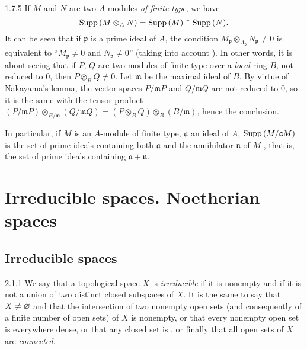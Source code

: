 \begin{env}{1.7.5}
\label{env-0.1.7.5}
If $M$ and $N$ are two $A$-modules \emph{of finite type}, we have
\[
  {\mathop{\mathrm{Supp}}\nolimits}\,(M\otimes_A N)={\mathop{\mathrm{Supp}}\nolimits}\,(M)\cap{\mathop{\mathrm{Supp}}\nolimits}\,(N).
\]
It can be seen that if $\mathfrak{p}$ is a prime ideal of $A$, the condition
$M_\mathfrak{p}\otimes_{A_\mathfrak{p}}N_\mathfrak{p}\neq 0$ is equivalent to
``$M_\mathfrak{p}\neq 0$ and $N_\mathfrak{p}\neq 0$'' (taking into account
). In other words, it is about seeing that if $P$, $Q$ are two modules of
finite type over a \emph{local} ring $B$, not reduced to $0$, then $P\otimes_B Q\neq 0$. Let
$\mathfrak{m}$ be the maximal ideal of $B$. By virtue of Nakayama's lemma, the vector spaces
$P/\mathfrak{m}P$ and $Q/\mathfrak{m}Q$ are not reduced to $0$, so it is the same with the
tensor product
$(P/\mathfrak{m}P)\otimes_{B/\mathfrak{m}}(Q/\mathfrak{m}Q)
  =(P\otimes_B Q)\otimes_B(B/\mathfrak{m})$,
hence the conclusion.

In particular, if $M$ is an $A$-module of finite type, $\mathfrak{a}$ an ideal of $A$,
${\mathop{\mathrm{Supp}}\nolimits}\,(M/\mathfrak{a}M)$ is the set of prime ideals containing both $\mathfrak{a}$ and the
annihilator $\mathfrak{n}$ of $M$ , that is, the set of prime ideals
containing $\mathfrak{a}+\mathfrak{n}$.
\end{env}

\section{Irreducible spaces. Noetherian spaces}
\label{0-prelim-2}

\subsection{Irreducible spaces}
\label{0-prelim-2.1}

\begin{env}{2.1.1}
\label{env-0.2.1.1}
We say that a topological space $X$ is \emph{irreducible} if it is nonempty and if it is not
a union of two distinct closed subspaces of $X$. It is the same to say that $X\neq\varnothing$ and
that the intersection of two nonempty open sets (and consequently of a finite number of open
sets) of $X$ is nonempty, or that every nonempty open set is everywhere dense, or that any
closed set is , or finally that all open sets of $X$ are
\emph{connected}.
\end{env}

